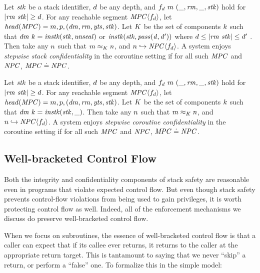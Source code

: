 \documentclass[acmsmall,review,anonymous]{acmart}\settopmatter{printfolios=true,printccs=false,printacmref=false}
\begin{document}
 Let \(\mathit{stk}\) be a stack identifier, \(d\) be any depth, and
\(f_d ~ m ~ (\_, \mathit{rm}, \_, \mathit{stk})\) hold for \(|\mathit{rm} ~ \mathit{stk}| \geq d\).
For any reachable segment \(\mathit{MPC} \langle f_d \rangle\),
let \(\mathit{head}(\mathit{MPC}) = m,p,(\mathit{dm},\mathit{rm},\mathit{yts},\mathit{stk})\). Let
\(K\) be the set of components \(k\) such that
\(\mathit{dm} ~ k = \mathit{instk}(\mathit{stk},\mathit{unseal})\) or \(\mathit{instk}(\mathit{stk},\mathit{pass(d,d')})\)
where \(d \leq |\mathit{rm} ~ \mathit{stk}| \leq d'\) .
Then take any \(n\) such that \(m \approx_K n\), and
\(n \hookrightarrow \mathit{NPC}\langle f_d \rangle\). A system enjoys
{\em stepwise stack confidentiality} in the coroutine setting if for all
such \(\mathit{MPC}\) and \(\mathit{NPC}\), \(\mathit{MPC} \doteq \mathit{NPC}\).

 Let \(\mathit{stk}\) be a stack identifier, \(d\) be any depth, and
\(f_d ~ m ~ (\_, \mathit{rm}, \_, \mathit{stk})\) hold for \(|\mathit{rm} ~ \mathit{stk}| \geq d\).
For any reachable segment \(\mathit{MPC} \langle f_d \rangle\),
let \(\mathit{head}(\mathit{MPC}) = m,p,(\mathit{dm},\mathit{rm},\mathit{yts},\mathit{stk})\). Let
\(K\) be the set of components \(k\) such that
\(\mathit{dm} ~ k = \mathit{instk}(\mathit{stk},\_)\).
Then take any \(n\) such that \(m \approx_K n\), and
\(n \hookrightarrow \mathit{NPC}\langle f_d \rangle\). A system enjoys
{\em stepwise coroutine confidentiality} in the coroutine setting if for all
such \(\mathit{MPC}\) and \(\mathit{NPC}\), \(\mathit{MPC} \doteq \mathit{NPC}\).

\subsection{Well-bracketed Control Flow}
\label{sec:wbcf}

Both the integrity and confidentiality components of stack safety
are reasonable even in programs that violate expected
control flow. But even though stack safety prevents control-flow violations
from being used to gain privileges, it is worth protecting control flow as well.
Indeed, all of the enforcement mechanisms we discuss do preserve well-bracketed
control flow.

When we focus on subroutines, the essence of well-bracketed control flow
is that a caller can expect that if its callee ever returns, it returns
to the caller at the appropriate return target. This is tantamount to saying
that we never ``skip'' a return, or perform a ``false'' one. To formalize this in
the simple model:
\end{document}

